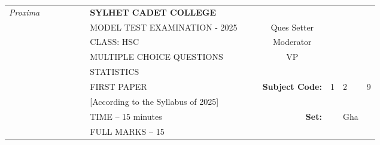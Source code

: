 \documentclass[12pt]{exam}
\begin{document}
\begin{table}[]
\begin{tabular}{lllllllllrlll}
\textit{Proxima} &  &  &  &  &  & \textbf{SYLHET CADET COLLEGE}       &  &                       & \multicolumn{1}{l}{}                        &                        &                        &                        \\ \cline{10-13} 
       &  &  &  &  &  & MODEL TEST EXAMINATION - 2025             &  & \multicolumn{1}{l|}{} & \multicolumn{1}{c|}{Ques Setter}            & \multicolumn{3}{l|}{}                                                    \\ \cline{10-13} 
       &  &  &  &  &  & CLASS: HSC                          &  & \multicolumn{1}{l|}{} & \multicolumn{1}{c|}{Moderator}              & \multicolumn{3}{l|}{}                                                    \\ \cline{10-13} 
       &  &  &  &  &  & MULTIPLE CHOICE QUESTIONS           &  & \multicolumn{1}{l|}{} & \multicolumn{1}{c|}{VP}                     & \multicolumn{3}{l|}{}                                                    \\ \cline{10-13} 
       &  &  &  &  &  & STATISTICS                          &  &                       &                                             &                        &                        &                        \\ \cline{11-13} 
       &  &  &  &  &  & FIRST PAPER                        &  &                       & \multicolumn{1}{r|}{\textbf{Subject Code:}} & \multicolumn{1}{l|}{1} & \multicolumn{1}{l|}{2} & \multicolumn{1}{l|}{9} \\ \cline{11-13} 
       &  &  &  &  &  & [According to the Syllabus of 2025] &  &                       &                                             &                        &                        &                        \\ \cline{12-12}
       &  &  &  &  &  & TIME – 15 minutes                   &  &                       & \textbf{Set:}                               & \multicolumn{1}{l|}{}  & \multicolumn{1}{l|}{Gha} &                        \\ \cline{12-12}
       &  &  &  &  &  & FULL MARKS – 15                     &  &                       & \multicolumn{1}{l}{}                        &                        &                        &                       
\end{tabular}
\end{table}
\end{document}
